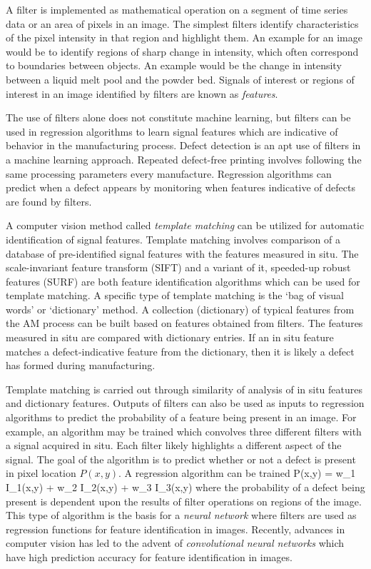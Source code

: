 A filter is implemented as mathematical operation on a segment of time series data or an area of pixels in an image. The simplest filters identify characteristics of the pixel intensity in that region and highlight them. An example for an image would be to identify regions of sharp change in intensity, which often correspond to boundaries between objects. An example would be the change in intensity between a liquid melt pool and the powder bed. Signals of interest or regions of interest in an image identified by filters are known as \textit{features}. 

The use of filters alone does not constitute machine learning, but filters can be used in regression algorithms to learn signal features which are indicative of behavior in the manufacturing process. Defect detection is an apt use of filters in a machine learning approach. Repeated defect-free printing involves following the same processing parameters every manufacture. Regression algorithms can predict when a defect appears by monitoring when features indicative of defects are found by filters. 

A computer vision method called  \textit{template matching} can be utilized for automatic identification of signal features. Template matching involves comparison of a database of pre-identified signal features with the features measured in situ. The scale-invariant feature transform (SIFT) \cite{Lowe2004} and a variant of it, speeded-up robust features (SURF) \cite{Bay2008} are both feature identification algorithms which can be used for template matching. A specific type of template matching is the `bag of visual words' or `dictionary' method. A collection (dictionary) of typical features from the AM process can be built based on features obtained from filters. The features measured in situ are compared with dictionary entries. If an in situ feature matches a defect-indicative feature from the dictionary, then it is likely a defect has formed during manufacturing.

Template matching is carried out through similarity of analysis of in situ features and dictionary features. Outputs of filters can also be used as inputs to regression algorithms to predict the probability of a feature being present in an image. For example, an algorithm may be trained which convolves three different filters with a signal acquired in situ. Each filter likely highlights a different aspect of the signal. The goal of the algorithm is to predict whether or not a defect is present in pixel location $P(x,y)$. A regression algorithm can be trained
\eqn
	P(x,y) = w_1 I_1(x,y) + w_2 I_2(x,y) + w_3 I_3(x,y)
	\label{filterregress}
\equ
where the probability of a defect being present is dependent upon the results of filter operations on regions of the image. This type of algorithm is the basis for a \textit{neural network} where filters are used as regression functions for feature identification in images. Recently, advances in computer vision has led to the advent of \textit{convolutional neural networks} which have high prediction accuracy for feature identification in images. 

